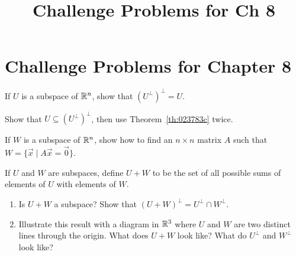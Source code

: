 \documentclass{ximera}
\title{Challenge Problems for Ch 8} \license{CC BY-NC-SA 4.0}
\begin{document}
\begin{abstract}
\end{abstract}
\maketitle

\section*{Challenge Problems for Chapter 8}

\begin{problem}\label{prob:8_1_13}
If $U$ is a subspace of $\mathbb{R}^n$, show that $\left(U^{\perp}\right)^\perp = U$. 
\begin{hint}
Show that $U \subseteq \left(U^{\perp}\right)^\perp$, then use Theorem~\ref{th:023783c} twice.
\end{hint}
\end{problem}


\begin{problem}\label{prob:8_1_14}
If $W$ is a subspace of $\mathbb{R}^n$, show how to find an $n \times n$ matrix $A$ such that $W = \{\vec{x} \mid A\vec{x} = \vec{0}\}$. 


\end{problem}

\begin{problem}\label{prob:8_1_16}
If $U$ and $W$ are subspaces, define $U+W$ to be the set of all possible sums of elements of $U$ with elements of $W$.

\begin{enumerate} 
\item Is $U+W$ a subspace?
Show that $(U + W)^\perp = U^\perp \cap W^\perp$. 
\item Illustrate this result with a diagram in $\mathbb{R}^3$ where $U$ and $W$ are two distinct lines through the origin.  What does $U+W$ look like?  What do $U^{\perp}$ and $W^{\perp}$ look like?
\end{enumerate}
\end{problem}
\end{document}
